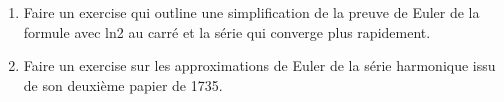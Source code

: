 \td 

\begin{enumerate}
    \item Faire un exercise qui outline une simplification de la preuve de Euler de la formule avec ln2 au carré et la série qui converge plus rapidement.
    \item Faire un exercise sur les approximations de Euler de la série harmonique issu de son deuxième papier de 1735.
\end{enumerate}

\td 